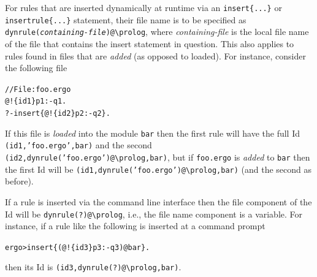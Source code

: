 \documentclass[11pt]{article}
\newcommand{\ERGO}{\mbox{\smaller{\ensuremath{\cal{E}}\smaller{{\sc{RGO}}}}}\xspace}
\newcommand{\FLSYSTEM}{\ERGO}
\newcommand{\prompt}{ergo> }
\newcommand{\ergoext}{ergo\xspace}
\newcommand{\bs}{\textbackslash}
\begin{document}
For rules that are inserted dynamically at runtime
via an \texttt{insert\{...\}} or
\texttt{insertrule\{...\}}  statement, their file name is to be specified
as \texttt{dynrule(\textnormal{\emph{containing-file}})@\bs{}prolog},
where \emph{containing-file} is the local file name of the
file that contains the insert statement in question.  This also applies to
rules found in files that are \emph{added} (as opposed to loaded). 
For instance, consider the following file
\begin{alltt}
   // File: foo.\ergoext
   @!\{id1\} p1 :- q1.
   ?- insert\{@!\{id2\} p2 :- q2\}.
\end{alltt}
If this file is \emph{loaded} into the module \texttt{bar} then the first
rule will have the full Id \texttt{(id1,'foo.\ergoext',bar)} and the second
\texttt{(id2,dynrule('foo.\ergoext')@\bs{}prolog,bar)}, but if
\texttt{foo.\ergoext} is \emph{added} to \texttt{bar} then the first Id will be
\texttt{(id1,dynrule('foo.\ergoext')@\bs{}prolog,bar)} (and the second as
before).

If a rule is inserted via the \FLSYSTEM command line interface then the
file component of the Id will be \texttt{dynrule(?)@\bs{}prolog}, i.e., the
file name component is a variable. For instance, if a rule like the
following is inserted at a command prompt
\begin{alltt}
   \prompt  insert\{(@!\{id3\} p3 :- q3)@bar\}.
\end{alltt}
then its Id is \texttt{(id3,dynrule(?)@\bs{}prolog,bar)}.
\end{document}
